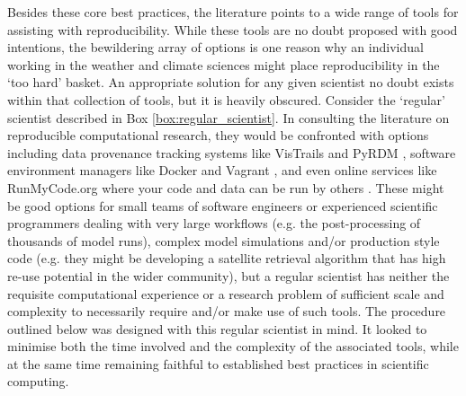 Besides these core best practices, the literature points to a wide range of tools for assisting with reproducibility. While these tools are no doubt proposed with good intentions, the bewildering array of options is one reason why an individual working in the weather and climate sciences might place reproducibility in the `too hard' basket. An appropriate solution for any given scientist no doubt exists within that collection of tools, but it is heavily obscured. Consider the `regular' scientist described in Box \ref{box:regular_scientist}. In consulting the literature on reproducible computational research, they would be confronted with options including data provenance tracking systems like VisTrails \citep{Freire2012} and PyRDM \citep{Jacobs2014}, software environment managers like Docker and Vagrant \citep{Stodden2014}, and even online services like RunMyCode.org where your code and data can be run by others \citep{Stodden2012}. These might be good options for small teams of software engineers or experienced scientific programmers dealing with very large workflows (e.g. the post-processing of thousands of model runs), complex model simulations and/or production style code (e.g. they might be developing a satellite retrieval algorithm that has high re-use potential in the wider community), but a regular scientist has neither the requisite computational experience or a research problem of sufficient scale and complexity to necessarily require and/or make use of such tools. The procedure outlined below was designed with this regular scientist in mind. It looked to minimise both the time involved and the complexity of the associated tools, while at the same time remaining faithful to established best practices in scientific computing.


